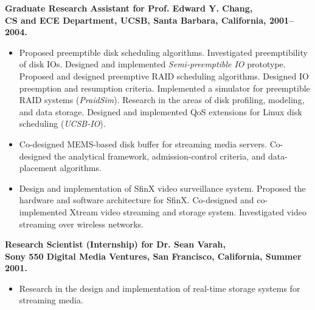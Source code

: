 \documentclass[10pt]{article}
\begin{document}
{\bf Graduate Research Assistant for Prof. Edward Y. Chang,\\
CS and ECE Department, UCSB, Santa Barbara, California, 2001--2004.}
\begin{itemize}
\vspace{-5pt}
\item 
{Proposed preemptible disk scheduling algorithms. Investigated  
 preemptibility of disk IOs. Designed and implemented {\em Semi-preemptible IO} 
 prototype. Proposed and designed preemptive RAID scheduling algorithms. 
 Designed IO preemption and resumption criteria.  
 Implemented a simulator for preemptible RAID systems ({\em PraidSim}). 
 Research in the areas of disk profiling, modeling, and data storage.
 Designed and implemented QoS extensions for Linux disk scheduling ({\em UCSB-IO}).}

\vspace{-5pt}
\item 
 Co-designed MEMS-based disk buffer for streaming media servers. 
 Co-designed the analytical framework, admission-control criteria, and data-placement 
 algorithms.

\vspace{-5pt}
\item 
Design and implementation of SfinX video surveillance system.
Proposed the hardware and software architecture for SfinX. 
Co-designed and co-implemented Xtream video streaming and storage system.
Investigated video streaming over wireless networks.
\end{itemize}




{\bf Research Scientist (Internship) for Dr. Sean Varah,\\
Sony 550 Digital Media Ventures, San Francisco, California, Summer 2001.}
\begin{itemize}
\vspace{-5pt}
\item
Research in the design and implementation of real-time storage systems for streaming media.
\end{itemize}
\end{document}
